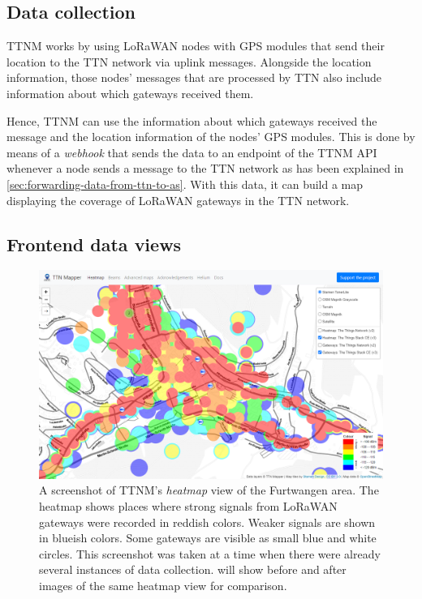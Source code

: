 \subsection{Data collection}\label{sec:ttm-data-collection}

\acl{TTNM} works by using \ac{LoRaWAN} nodes with \ac{GPS} modules that send their location to the \ac{TTN} network via uplink messages.
Alongside the location information, those nodes' messages that are processed by \ac{TTN} also include information about which gateways received them.

Hence, \acl{TTNM} can use the information about which gateways received the message and the location information of the nodes' \ac{GPS} modules.
This is done by means of a \emph{webhook} that sends the data to an endpoint of the \acl{TTNM} \ac{API} whenever a node sends a message to the \ac{TTN} network as has been explained in \cref{sec:forwarding-data-from-ttn-to-as}.
With this data, it can build a map displaying the coverage of \ac{LoRaWAN} gateways in the \ac{TTN} network.

\subsection{Frontend data views}

\begin{figure}[htbp]
    \centering
    \includegraphics[width=1\textwidth]{pictures/ttn-mapper/heatmap_with_gateways.png}
    \caption{
        A screenshot of \ac{TTNM}'s \emph{heatmap} view of the Furtwangen area.
        The heatmap shows places where strong signals from \ac{LoRaWAN} gateways were recorded in reddish colors.
        Weaker signals are shown in blueish colors.
        Some gateways are visible as small blue and white circles.
        This screenshot was taken at a time when there were already several instances of data collection.
         will show before and after images of the same heatmap view for comparison.~\protect\cite{ttn_mapper_ttn_2023}
    }\label{pic:ttn-mapper-heatmap-with-gateways}
\end{figure}

